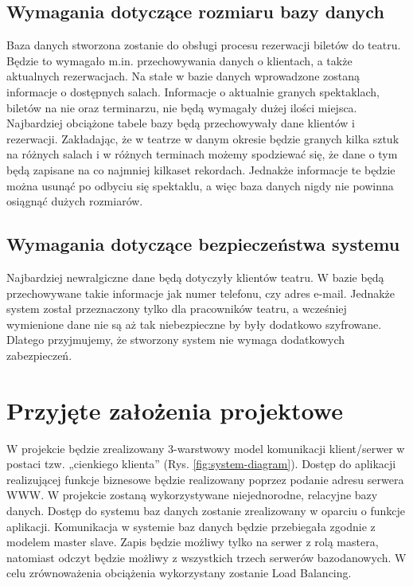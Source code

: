 \documentclass{mgr}
\begin{document}
\subsection{Wymagania dotyczące rozmiaru bazy danych}
Baza danych stworzona zostanie do obsługi procesu rezerwacji biletów do teatru. Będzie to wymagało m.in. przechowywania danych o klientach, a także aktualnych rezerwacjach. Na stałe w bazie danych wprowadzone zostaną informacje o dostępnych salach. Informacje o aktualnie granych spektaklach, biletów na nie oraz terminarzu, nie będą wymagały dużej ilości miejsca. Najbardziej obciążone tabele bazy będą przechowywały dane klientów i rezerwacji. Zakładając, że w teatrze w danym okresie będzie granych kilka sztuk na różnych salach i w różnych terminach możemy spodziewać się, że dane o tym będą zapisane na co najmniej kilkaset rekordach. Jednakże informacje te będzie można usunąć po odbyciu się spektaklu, a więc baza danych nigdy nie powinna osiągnąć dużych rozmiarów.

\subsection{Wymagania dotyczące bezpieczeństwa systemu}
Najbardziej newralgiczne dane będą dotyczyły klientów teatru. W bazie będą przechowywane takie informacje jak numer telefonu, czy adres e-mail. Jednakże system został przeznaczony tylko dla pracowników teatru, a wcześniej wymienione dane nie są aż tak niebezpieczne by były dodatkowo szyfrowane. Dlatego przyjmujemy, że stworzony system nie wymaga dodatkowych zabezpieczeń.

\section{Przyjęte założenia projektowe}
W projekcie będzie zrealizowany 3-warstwowy model komunikacji klient/serwer w postaci tzw. „cienkiego klienta” (Rys. \ref{fig:system-diagram}). Dostęp  do  aplikacji  realizującej  funkcje  biznesowe  będzie realizowany poprzez podanie adresu serwera WWW. W projekcie zostaną wykorzystywane niejednorodne, relacyjne bazy danych.  Dostęp  do  systemu baz  danych  zostanie zrealizowany  w  oparciu  o funkcje aplikacji. Komunikacja w systemie baz danych będzie przebiegała zgodnie z modelem master slave. Zapis będzie możliwy tylko na serwer z rolą mastera, natomiast odczyt będzie możliwy z wszystkich trzech serwerów bazodanowych. W celu zrównoważenia obciążenia wykorzystany zostanie Load Balancing.
\end{document}
